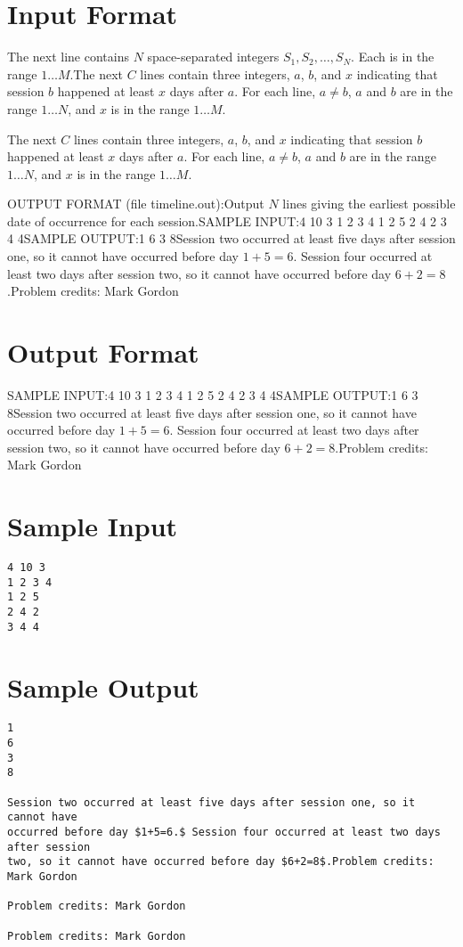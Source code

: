 \documentclass[12pt]{article}
\begin{document}
\section*{Input Format}
The next line contains $N$ space-separated integers $S_1,S_2,\ldots, S_N$.  Each
is in the range $1 \ldots M$.The next $C$ lines contain three integers, $a$, $b$, and $x$ indicating that
session $b$ happened at least $x$ days after $a$.  For each line, $a \neq b$,
$a$ and $b$ are in the range $1 \ldots N$, and $x$ is in the range $1 \ldots M$.

The next $C$ lines contain three integers, $a$, $b$, and $x$ indicating that
session $b$ happened at least $x$ days after $a$.  For each line, $a \neq b$,
$a$ and $b$ are in the range $1 \ldots N$, and $x$ is in the range $1 \ldots M$.

OUTPUT FORMAT (file timeline.out):Output $N$ lines giving the earliest possible date of occurrence for each
session.SAMPLE INPUT:4 10 3
1 2 3 4
1 2 5
2 4 2
3 4 4SAMPLE OUTPUT:1
6
3
8Session two occurred at least five days after session one, so it cannot have
occurred before day $1+5=6.$ Session four occurred at least two days after session
two, so it cannot have occurred before day $6+2=8$.Problem credits: Mark Gordon

\section*{Output Format}
SAMPLE INPUT:4 10 3
1 2 3 4
1 2 5
2 4 2
3 4 4SAMPLE OUTPUT:1
6
3
8Session two occurred at least five days after session one, so it cannot have
occurred before day $1+5=6.$ Session four occurred at least two days after session
two, so it cannot have occurred before day $6+2=8$.Problem credits: Mark Gordon

\section*{Sample Input}
\begin{verbatim}
4 10 3
1 2 3 4
1 2 5
2 4 2
3 4 4
\end{verbatim}

\section*{Sample Output}
\begin{verbatim}
1
6
3
8

Session two occurred at least five days after session one, so it cannot have
occurred before day $1+5=6.$ Session four occurred at least two days after session
two, so it cannot have occurred before day $6+2=8$.Problem credits: Mark Gordon

Problem credits: Mark Gordon

Problem credits: Mark Gordon
\end{verbatim}
\end{document}
